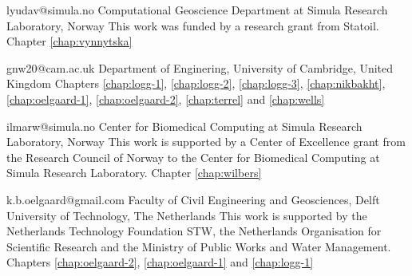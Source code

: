              {lyudav@simula.no}
             {Computational Geoscience Department at Simula Research Laboratory, Norway}
             {This work was funded by a research grant from Statoil.}
             {Chapter \ref{chap:vynnytska}}

             {gnw20@cam.ac.uk}
             {Department of Enginering, University of Cambridge, United Kingdom}
             {}
             {Chapters \ref{chap:logg-1}, \ref{chap:logg-2}, \ref{chap:logg-3},
              \ref{chap:nikbakht}, \ref{chap:oelgaard-1}, \ref{chap:oelgaard-2},
              \ref{chap:terrel} and \ref{chap:wells}}

             {ilmarw@simula.no}
             {Center for Biomedical Computing at Simula Research Laboratory, Norway}
             {This work is supported by a Center of Excellence grant
              from the Research Council of Norway to the Center for
              Biomedical Computing at Simula Research Laboratory.}
             {Chapter \ref{chap:wilbers}}

             {k.b.oelgaard@gmail.com}
             {Faculty of Civil Engineering and Geosciences,
              Delft University of Technology, The Netherlands}
             {This work is supported by the Netherlands Technology Foundation
              STW, the Netherlands Organisation for Scientific Research and the
              Ministry of Public Works and Water Management.}
             {Chapters \ref{chap:oelgaard-2}, \ref{chap:oelgaard-1} and
              \ref{chap:logg-1}}
